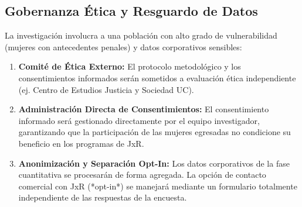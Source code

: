 \subsection{Gobernanza Ética y Resguardo de Datos}
La investigación involucra a una población con alto grado de vulnerabilidad (mujeres con antecedentes penales) y datos corporativos sensibles:
\begin{enumerate}
    \item \textbf{Comité de Ética Externo:} El protocolo metodológico y los consentimientos informados serán sometidos a evaluación ética independiente (ej. Centro de Estudios Justicia y Sociedad UC).
    \item \textbf{Administración Directa de Consentimientos:} El consentimiento informado será gestionado directamente por el equipo investigador, garantizando que la participación de las mujeres egresadas no condicione su beneficio en los programas de JxR.
    \item \textbf{Anonimización y Separación Opt-In:} Los datos corporativos de la fase cuantitativa se procesarán de forma agregada. La opción de contacto comercial con JxR (*opt-in*) se manejará mediante un formulario totalmente independiente de las respuestas de la encuesta.
\end{enumerate}
